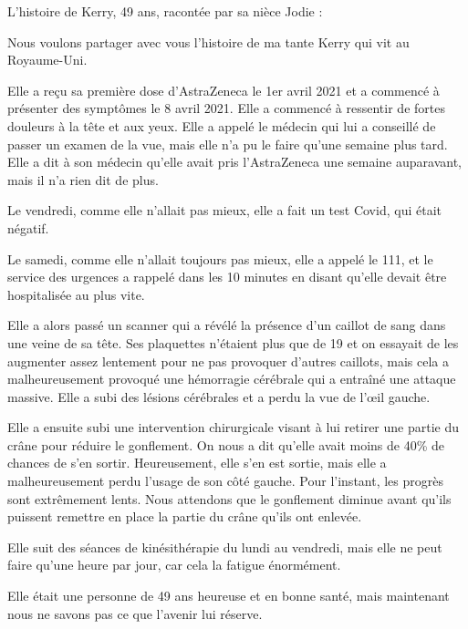 L'histoire de Kerry, 49 ans, racontée par sa nièce Jodie :

Nous voulons partager avec vous l'histoire de ma tante Kerry qui vit au
Royaume-Uni.

Elle a reçu sa première dose d'AstraZeneca le 1er avril 2021 et a commencé à
présenter des symptômes le 8 avril 2021. Elle a commencé à ressentir de fortes
douleurs à la tête et aux yeux. Elle a appelé le médecin qui lui a conseillé de
passer un examen de la vue, mais elle n'a pu le faire qu'une semaine plus
tard. Elle a dit à son médecin qu'elle avait pris l'AstraZeneca une semaine
auparavant, mais il n'a rien dit de plus.

Le vendredi, comme elle n'allait pas mieux, elle a fait un test Covid, qui était
négatif.

Le samedi, comme elle n'allait toujours pas mieux, elle a appelé le 111, et le
service des urgences a rappelé dans les 10 minutes en disant qu'elle devait être
hospitalisée au plus vite.

Elle a alors passé un scanner qui a révélé la présence d'un caillot de sang dans
une veine de sa tête. Ses plaquettes n'étaient plus que de 19 et on essayait de
les augmenter assez lentement pour ne pas provoquer d'autres caillots, mais cela
a malheureusement provoqué une hémorragie cérébrale qui a entraîné une attaque
massive. Elle a subi des lésions cérébrales et a perdu la vue de l'œil gauche.

Elle a ensuite subi une intervention chirurgicale visant à lui retirer une
partie du crâne pour réduire le gonflement. On nous a dit qu'elle avait moins de
40\% de chances de s'en sortir. Heureusement, elle s'en est sortie, mais elle a
malheureusement perdu l'usage de son côté gauche. Pour l'instant, les progrès
sont extrêmement lents. Nous attendons que le gonflement diminue avant qu'ils
puissent remettre en place la partie du crâne qu'ils ont enlevée.

Elle suit des séances de kinésithérapie du lundi au vendredi, mais elle ne peut
faire qu'une heure par jour, car cela la fatigue énormément.

Elle était une personne de 49 ans heureuse et en bonne santé, mais maintenant
nous ne savons pas ce que l'avenir lui réserve.

